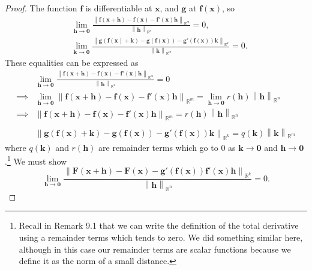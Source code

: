 \documentclass{article}
\newcommand{\R}{\mathbb{R}}
\newcommand{\x}{\mathbf{x}}
\newcommand{\f}{\mathbf{f}}
\newcommand{\h}{\mathbf{h}}
\newcommand{\ze}{\mathbf{0}}
\newcommand{\norm}[1]{\left\lVert#1\right\rVert}
\theoremstyle{definition}
\begin{document}
	\begin{proof}
		The function $ \f $ is differentiable at $ \x $, and $ \mathbf g $ at $ \f(\x) $, so 
		\begin{align*}
			&\lim\limits_{\mathbf h\to \ze}\frac{\norm{\f(\x+\mathbf h) - \f(\x)-\f'(\x)\mathbf{h}}_{\R^m}}{\norm{\mathbf h}_{\R^n}} = 0,\\
			&\lim\limits_{\mathbf k\to \ze}\frac{\norm{\mathbf g(\f(\x) + \mathbf k) - \mathbf g(\f(\x))-\mathbf g'(\f(\x))\mathbf{k}}_{\R^k}}{\norm{\mathbf k}_{\R^m}} = 0.
		\end{align*}
		These equalities can be expressed as 
		\begin{align}
			&\lim\limits_{\mathbf h\to \ze}\frac{\norm{\f(\x+\mathbf h) - \f(\x)-\f'(\x)\mathbf{h}}_{\R^m}}{\norm{\mathbf h}_{\R^n}} = 0 \nonumber\\ 
			\implies& \lim\limits_{\mathbf h\to \ze}\norm{\f(\x+\mathbf h) - \f(\x)-\f'(\x)\mathbf{h}}_{\R^m}= \lim\limits_{\mathbf h\to \ze}r(\h)\norm{\mathbf h}_{\R^n}\nonumber\\
			\implies&  \norm{\f(\x+\mathbf h) - \f(\x)-\f'(\x)\mathbf{h}}_{\R^m}= r(\h)\norm{\mathbf h}_{\R^n}\\\nonumber\\
			&\norm{\mathbf g(\f(\x) + \mathbf k) - \mathbf g(\f(\x))-\mathbf g'(\f(\x))\mathbf{k}}_{\R^k} = q(\mathbf k)\norm{\mathbf k}_{\R^m}
		\end{align}
		where $ q(\mathbf k) $ and $ r(\h) $ are remainder terms which go to $ 0 $ as $ \mathbf k\to\ze  $ and $ \h\to \ze $.\footnote{Recall in Remark 9.1 that we can write the definition of the total derivative using a remainder terms which tends to zero. We did something similar here, although in this case our remainder terms are scalar functions because we define it as the norm of a small distance.} We must show $$\lim_{\mathbf h\to \ze}	\frac{\norm{\mathbf F(\x + \h) -\mathbf F(\x) - \mathbf g'(\f(\x))\f'(\x)\h}_{\R^k}}{\norm{\h}_{\R^n}} = 0.$$
		

\end{proof}
\end{document}
